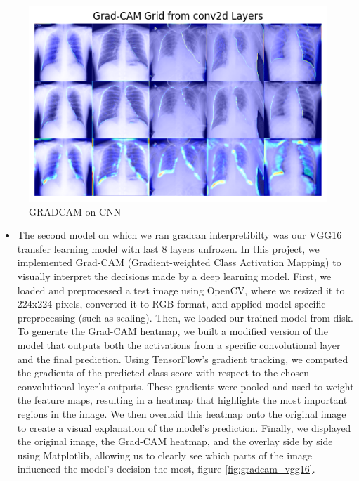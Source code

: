 \documentclass{article}
\begin{document}
\begin{figure}[ht] %
    \centering
    \includegraphics[width=1.0\linewidth]{cnngradcamoutput.png}
    \caption{GRADCAM on CNN}
    \label{fig:gradcam_CNN}
\end{figure}
\begin{itemize}
\newpage
    \item The second model on which we ran gradcan interpretibilty was our VGG16 transfer learning model with last 8 layers unfrozen. In this project, we implemented Grad-CAM (Gradient-weighted Class Activation Mapping) to visually interpret the decisions made by a deep learning model. First, we loaded and preprocessed a test image using OpenCV, where we resized it to 224x224 pixels, converted it to RGB format, and applied model-specific preprocessing (such as scaling). Then, we loaded our trained model from disk. To generate the Grad-CAM heatmap, we built a modified version of the model that outputs both the activations from a specific convolutional layer and the final prediction. Using TensorFlow's gradient tracking, we computed the gradients of the predicted class score with respect to the chosen convolutional layer's outputs. These gradients were pooled and used to weight the feature maps, resulting in a heatmap that highlights the most important regions in the image. We then overlaid this heatmap onto the original image to create a visual explanation of the model's prediction. Finally, we displayed the original image, the Grad-CAM heatmap, and the overlay side by side using Matplotlib, allowing us to clearly see which parts of the image influenced the model’s decision the most, figure \ref{fig:gradcam_vgg16}.
\end{itemize}
   
\end{document}
